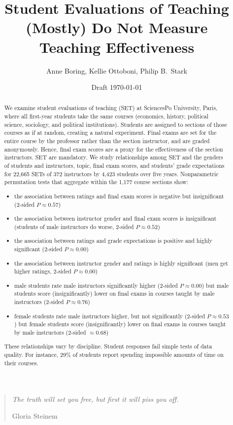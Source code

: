 \documentclass[12pt]{article}
\title{Student Evaluations of Teaching (Mostly) Do Not Measure Teaching Effectiveness}
\author{Anne Boring, Kellie Ottoboni, Philip B.~Stark}
\date{Draft \today}
\begin{document}
\maketitle

\newpage
\begin{quotation}
    \emph{The truth will set you free, but first it will piss you off.}
    
     \hfill Gloria Steinem

\begin{abstract}
We examine student evaluations of teaching (SET) at SciencesPo
University, Paris, where all
first-year students take the same courses 
(economics, history, political science, sociology, and political institutions). 
Students are assigned to sections of those courses as if at random, creating a natural experiment.
Final exams are set for the entire course
by the professor rather than the section instructor, and are graded anonymously.
Hence, final exam scores are a proxy for the effectiveness of the section instructors.
SET are mandatory.
We study relationships among SET and the genders of students and
instructors, topic, final exam scores, and students' grade expectations
for 22,665 SETs of 372 instructors by 4,423 students over five years.
Nonparametric permutation tests that aggregate within the 1,177 course sections show: 
\begin{itemize}
   \item the association between ratings and final 
            exam scores is negative but insignificant
            (2-sided $P \approx 0.57$)
   \item the association between instructor gender 
            and final exam scores is insignificant
            (students of male instructors do worse, 2-sided $P \approx 0.52$)
   \item the association between ratings and grade 
            expectations is positive and highly significant
            (2-sided $P \approx 0.00$)
   \item the association between instructor 
            gender and ratings is highly significant 
            (men get higher ratings, 2-sided $P \approx 0.00$)
   \item male students rate male instructors significantly higher (2-sided $P \approx 0.00$) 
            but male students score (insignificantly) lower on final exams in courses taught
            by male instructors (2-sided $P \approx 0.76$)
   \item female students rate male instructors higher, but not significantly (2-sided $P \approx 0.53$)
            but female students score (insignificantly) lower on final exams in courses taught
            by male instructors (2-sided $\approx 0.68$)
\end{itemize}
These relationships vary by discipline.
Student responses fail simple tests of data quality.
For instance, 29\% of students report spending impossible amounts of time
on their courses.

\end{abstract}

\newpage

\end{quotation}
\end{document}
